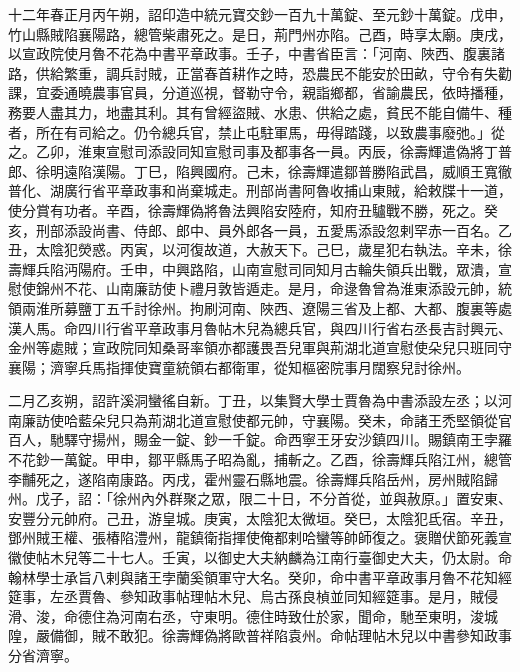 \begin{pinyinscope}
 十二年春正月丙午朔，詔印造中統元寶交鈔一百九十萬錠、至元鈔十萬錠。戊申，竹山縣賊陷襄陽路，總管柴肅死之。是日，荊門州亦陷。己酉，時享太廟。庚戌，以宣政院使月魯不花為中書平章政事。壬子，中書省臣言：「河南、陜西、腹裏諸路，供給繁重，調兵討賊，正當春首耕作之時，恐農民不能安於田畝，守令有失勸課，宜委通曉農事官員，分道巡視，督勒守令，親詣鄉都，省諭農民，依時播種，務要人盡其力，地盡其利。其有曾經盜賊、水患、供給之處，貧民不能自備牛、種者，所在有司給之。仍令總兵官，禁止屯駐軍馬，毋得踏踐，以致農事廢弛。」從之。乙卯，淮東宣慰司添設同知宣慰司事及都事各一員。丙辰，徐壽輝遣偽將丁普郎、徐明遠陷漢陽。丁巳，陷興國府。己未，徐壽輝遣鄒普勝陷武昌，威順王寬徹普化、湖廣行省平章政事和尚棄城走。刑部尚書阿魯收捕山東賊，給敕牒十一道，使分賞有功者。辛酉，徐壽輝偽將魯法興陷安陸府，知府丑驢戰不勝，死之。癸亥，刑部添設尚書、侍郎、郎中、員外郎各一員，五愛馬添設忽剌罕赤一百名。乙丑，太陰犯熒惑。丙寅，以河復故道，大赦天下。己巳，歲星犯右執法。辛未，徐壽輝兵陷沔陽府。壬申，中興路陷，山南宣慰司同知月古輪失領兵出戰，眾潰，宣慰使錦州不花、山南廉訪使卜禮月敦皆遁走。是月，命逯魯曾為淮東添設元帥，統領兩淮所募鹽丁五千討徐州。拘刷河南、陜西、遼陽三省及上都、大都、腹裏等處漢人馬。命四川行省平章政事月魯帖木兒為總兵官，與四川行省右丞長吉討興元、金州等處賊；宣政院同知桑哥率領亦都護畏吾兒軍與荊湖北道宣慰使朵兒只班同守襄陽；濟寧兵馬指揮使寶童統領右都衛軍，從知樞密院事月闊察兒討徐州。



 二月乙亥朔，詔許溪洞蠻徭自新。丁丑，以集賢大學士賈魯為中書添設左丞；以河南廉訪使哈藍朵兒只為荊湖北道宣慰使都元帥，守襄陽。癸未，命諸王禿堅領從官百人，馳驛守揚州，賜金一錠、鈔一千錠。命西寧王牙安沙鎮四川。賜鎮南王孛羅不花鈔一萬錠。甲申，鄒平縣馬子昭為亂，捕斬之。乙酉，徐壽輝兵陷江州，總管李黼死之，遂陷南康路。丙戌，霍州靈石縣地震。徐壽輝兵陷岳州，房州賊陷歸州。戊子，詔：「徐州內外群聚之眾，限二十日，不分首從，並與赦原。」置安東、安豐分元帥府。己丑，游皇城。庚寅，太陰犯太微垣。癸巳，太陰犯氐宿。辛丑，鄧州賊王權、張椿陷澧州，龍鎮衛指揮使俺都剌哈蠻等帥師復之。褒贈伏節死義宣徽使帖木兒等二十七人。壬寅，以御史大夫納麟為江南行臺御史大夫，仍太尉。命翰林學士承旨八剌與諸王孛蘭奚領軍守大名。癸卯，命中書平章政事月魯不花知經筵事，左丞賈魯、參知政事帖理帖木兒、烏古孫良楨並同知經筵事。是月，賊侵滑、浚，命德住為河南右丞，守東明。德住時致仕於家，聞命，馳至東明，浚城隍，嚴備御，賊不敢犯。徐壽輝偽將歐普祥陷袁州。命帖理帖木兒以中書參知政事分省濟寧。




\end{pinyinscope}
